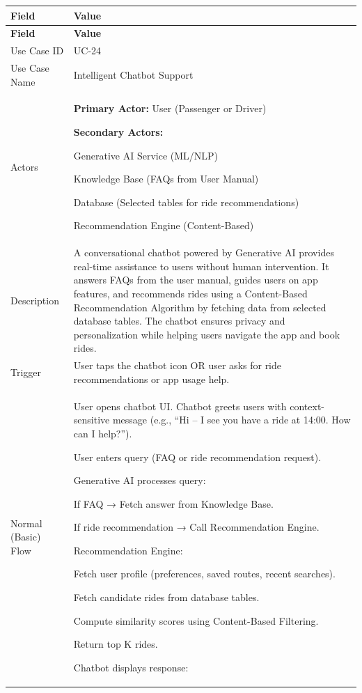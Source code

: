 \begin{longtable}{|p{3.5cm}|p{12cm}|}
\hline
\rowcolor{lightgray!30}
\textbf{Field} & \textbf{Value} \\
\hline
\endfirsthead
\hline
\rowcolor{lightgray!30}
\textbf{Field} & \textbf{Value} \\
\hline
\endhead
\hline
\endfoot
Use Case ID & UC-24 \\
\hline
Use Case Name & Intelligent Chatbot Support \\
\hline
Actors &
\textbf{Primary Actor:} User (Passenger or Driver)

\textbf{Secondary Actors:}

Generative AI Service (ML/NLP)

Knowledge Base (FAQs from User Manual)

Database (Selected tables for ride recommendations)

Recommendation Engine (Content-Based) \\
\hline
Description &
A conversational chatbot powered by Generative AI provides real-time assistance to users without human intervention. It answers FAQs from the user manual, guides users on app features, and recommends rides using a Content-Based Recommendation Algorithm by fetching data from selected database tables. The chatbot ensures privacy and personalization while helping users navigate the app and book rides. \\
\hline
Trigger &
User taps the chatbot icon OR user asks for ride recommendations or app usage help. \\
\hline
Normal (Basic) Flow &
User opens chatbot UI. Chatbot greets users with context-sensitive message (e.g., “Hi – I see you have a ride at 14:00. How can I help?”).

User enters query (FAQ or ride recommendation request).

Generative AI processes query:

If FAQ → Fetch answer from Knowledge Base.

If ride recommendation → Call Recommendation Engine.

Recommendation Engine:

Fetch user profile (preferences, saved routes, recent searches).

Fetch candidate rides from database tables.

Compute similarity scores using Content-Based Filtering.

Return top K rides.

Chatbot displays response:


\end{longtable}
